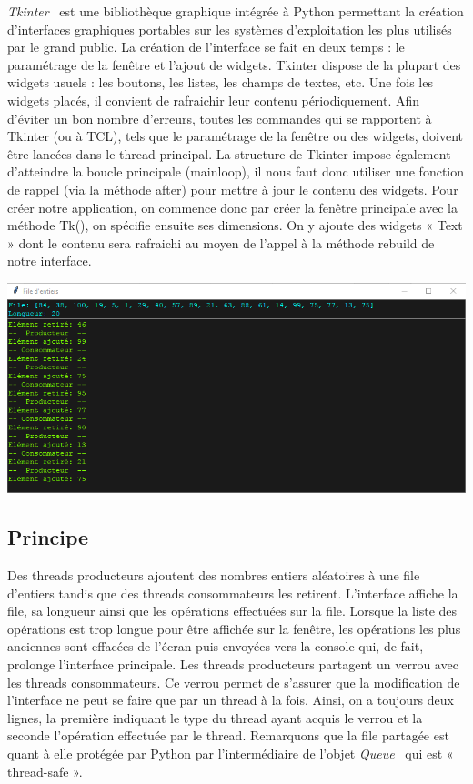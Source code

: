 \documentclass{article}
\begin{document}
\textit{Tkinter}~\cite{refTkinter} est une bibliothèque graphique intégrée à Python permettant la création d’interfaces graphiques portables sur les systèmes d’exploitation les plus utilisés par le grand public.
\medbreak
La création de l’interface se fait en deux temps : le paramétrage de la fenêtre et l’ajout de widgets. Tkinter dispose de la plupart des widgets usuels : les boutons, les listes, les champs de textes, etc. Une fois les widgets placés, il convient de rafraichir leur contenu périodiquement.
\medbreak
Afin d’éviter un bon nombre d’erreurs, toutes les commandes qui se rapportent à Tkinter (ou à TCL), tels que le paramétrage de la fenêtre ou des widgets, doivent être lancées dans le thread principal. La structure de Tkinter impose également d’atteindre la boucle principale (mainloop), il nous faut donc utiliser une fonction de rappel (via la méthode after) pour mettre à jour le contenu des widgets.
\medbreak
Pour créer notre application, on commence donc par créer la fenêtre principale avec la méthode Tk(), on spécifie ensuite ses dimensions. On y ajoute des widgets « Text » dont le contenu sera rafraichi au moyen de l’appel à la méthode rebuild de notre interface.
\bigbreak
\begin{center}
  \includegraphics[scale=0.66]{File_d'entiers.png}
\end{center}
\bigbreak

\subsection{Principe}

Des threads producteurs ajoutent des nombres entiers aléatoires à une file d’entiers tandis que des threads consommateurs les retirent. L’interface affiche la file, sa longueur ainsi que les opérations effectuées sur la file. Lorsque la liste des opérations est trop longue pour être affichée sur la fenêtre, les opérations les plus anciennes sont effacées de l’écran puis envoyées vers la console qui, de fait, prolonge l’interface principale.
\medbreak
Les threads producteurs partagent un verrou avec les threads consommateurs. Ce verrou permet de s’assurer que la modification de l’interface ne peut se faire que par un thread à la fois. Ainsi, on a toujours deux lignes, la première indiquant le type du thread ayant acquis le verrou et la seconde l’opération effectuée par le thread. Remarquons que la file partagée est quant à elle protégée par Python par l’intermédiaire de l’objet \textit{Queue}~\cite{refPythonQueue} qui est « thread-safe ».
\end{document}
